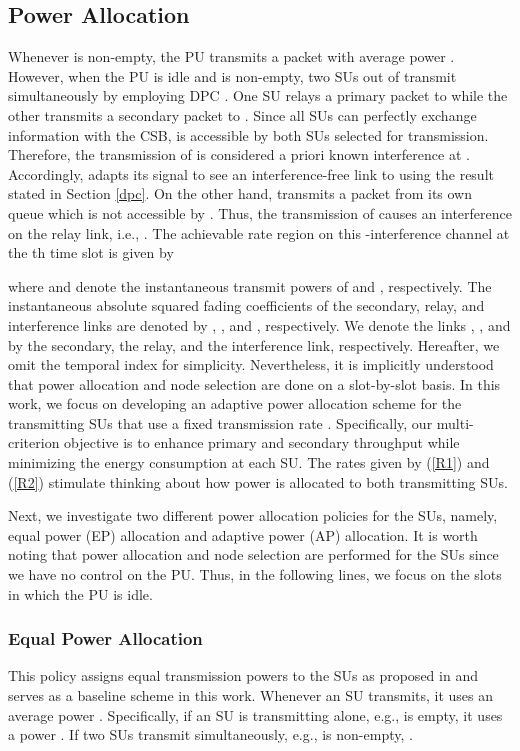 \documentclass[journal,twocolumn]{IEEEtran}
\begin{document}
\subsection{Power Allocation}
Whenever  is non-empty, the PU transmits a packet with average power . However, when the PU is idle and  is non-empty, two SUs out of  transmit simultaneously by employing DPC \cite{DPC}. One SU relays a primary packet to  while the other transmits a secondary packet to . Since all SUs can perfectly exchange information with the CSB,  is accessible by both SUs selected for transmission. Therefore, the transmission of  is considered a priori known interference at . Accordingly,  adapts its signal to see an interference-free link to  using the result stated in Section \ref{dpc}. On the other hand,  transmits a packet from its own queue which is not accessible by . Thus, the transmission of  causes an interference on the relay link, i.e., . The achievable rate region on this -interference channel at the th time slot is given by

where  and  denote the instantaneous transmit powers of  and , respectively. The instantaneous absolute squared fading coefficients of the secondary, relay, and interference links are denoted by , , and , respectively. We denote the links , , and  by the secondary, the relay, and the interference link, respectively. 
Hereafter, we omit the temporal index  for simplicity. Nevertheless, it is implicitly understood that power allocation and node selection are done on a slot-by-slot basis. In this work, we focus on developing an adaptive power allocation scheme for the transmitting SUs that use a fixed transmission rate . Specifically, our multi-criterion objective is to enhance primary and secondary throughput while minimizing the energy consumption at each SU. The rates given by (\ref{R1}) and (\ref{R2}) stimulate thinking about how power is allocated to both transmitting SUs.

Next, we investigate two different power allocation policies for the SUs, namely, equal power (EP) allocation and adaptive power (AP) allocation. It is worth noting that power allocation and node selection are performed for the SUs since we have no control on the PU. 
Thus, in the following lines, we focus on the slots in which the PU is idle.

\subsubsection{Equal Power Allocation}\label{UP}
This policy assigns equal transmission powers to the SUs as proposed in \cite{Krikidis} and serves as a baseline scheme in this work. Whenever an SU transmits, it uses an average power . Specifically, if an SU is transmitting alone, e.g.,  is empty, it uses a power . If two SUs transmit simultaneously, e.g.,  is non-empty, .
\end{document}
